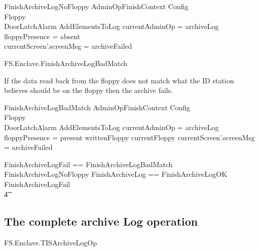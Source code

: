 \begin{schema}{FinishArchiveLogNoFloppy}
        AdminOpFinishContext
\also
        \Xi Config
\\      \Xi Floppy
\\      \Xi DoorLatchAlarm
\also
        AddElementsToLog
\where
       \The currentAdminOp = archiveLog
\\      floppyPresence = absent
\also
\\      currentScreen'.screenMsg = archiveFailed
\end{schema}


\begin{traceunit}{FS.Enclave.FinishArchiveLogBadMatch}
\end{traceunit}


If the data read back from the floppy does not match what the ID
station believes should be on the floppy then the archive fails.

\begin{schema}{FinishArchiveLogBadMatch}
        AdminOpFinishContext
\also
        \Xi Config
\\      \Xi Floppy
\\      \Xi DoorLatchAlarm
\also
        AddElementsToLog
\where
        \The currentAdminOp = archiveLog
\\      floppyPresence = present
\also
        writtenFloppy \neq currentFloppy
\also
        currentScreen'.screenMsg = archiveFailed
\end{schema}

\begin{zed}
        FinishArchiveLogFail == FinishArchiveLogBadMatch \lor
        FinishArchiveLogNoFloppy
\also
        FinishArchiveLog == FinishArchiveLogOK \lor FinishArchiveLogFail
\\ \t4  \lor
        [~ BadAdminLogout | enclaveStatus = waitingFinishAdminOp
\\ \t6  \land \The currentAdminOp = archiveLog      ~]
\end{zed}

\subsection{The complete archive Log operation}

\begin{traceunit}{FS.Enclave.TISArchiveLogOp}
\end{traceunit}



